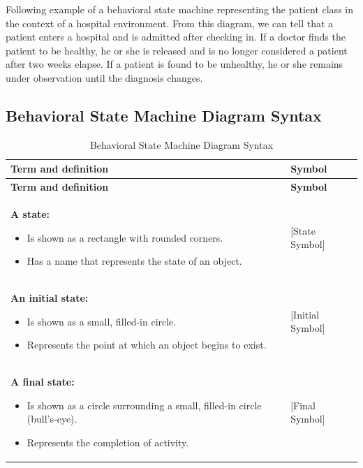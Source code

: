 \documentclass[12pt,a4paper]{report}
\begin{document}
Following example of a behavioral state machine representing the patient class in the context of a hospital environment. From this diagram, we can tell that a patient enters a hospital and is admitted after checking in. If a doctor finds the patient to be healthy, he or she is released and is no longer considered a patient after two weeks elapse. If a patient is found to be unhealthy, he or she remains under observation until the diagnosis changes.

\subsection*{Behavioral State Machine Diagram Syntax}

\begin{longtable}{|p{8cm}|p{4cm}|}
\caption{Behavioral State Machine Diagram Syntax} \label{tab:state} \\
\hline
\textbf{Term and definition} & \textbf{Symbol} \\
\hline
\endfirsthead
\hline
\textbf{Term and definition} & \textbf{Symbol} \\
\hline
\endhead

\textbf{A state:} \newline
\begin{itemize}
    \item Is shown as a rectangle with rounded corners.
    \item Has a name that represents the state of an object.
\end{itemize} & [State Symbol] \\
\hline

\textbf{An initial state:} \newline
\begin{itemize}
    \item Is shown as a small, filled-in circle.
    \item Represents the point at which an object begins to exist.
\end{itemize} & [Initial Symbol] \\
\hline

\textbf{A final state:} \newline
\begin{itemize}
    \item Is shown as a circle surrounding a small, filled-in circle (bull's-eye).
    \item Represents the completion of activity.
\end{itemize} & [Final Symbol] \\
\hline


\end{longtable}
\end{document}
